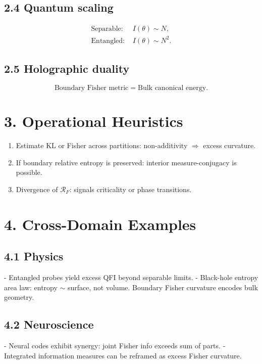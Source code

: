 \documentclass[12pt]{article}
\begin{document}
\subsection*{2.4 Quantum scaling}
\begin{align*}
\text{Separable: } & I(\theta) \sim N, \\
\text{Entangled: } & I(\theta) \sim N^2.
\end{align*}

\subsection*{2.5 Holographic duality}
\[
\text{Boundary Fisher metric} = \text{Bulk canonical energy}.
\]

\section*{3. Operational Heuristics}
\begin{enumerate}[label=(\alph*)]
    \item Estimate KL or Fisher across partitions: non-additivity $\Rightarrow$ excess curvature.
    \item If boundary relative entropy is preserved: interior measure-conjugacy is possible.
    \item Divergence of $\mathcal R_F$: signals criticality or phase transitions.
\end{enumerate}

\section*{4. Cross-Domain Examples}
\subsection*{4.1 Physics}
- Entangled probes yield excess QFI beyond separable limits.
- Black-hole entropy area law: entropy $\sim$ surface, not volume. Boundary Fisher curvature encodes bulk geometry.

\subsection*{4.2 Neuroscience}
- Neural codes exhibit synergy: joint Fisher info exceeds sum of parts.
- Integrated information measures can be reframed as excess Fisher curvature.
\end{document}
